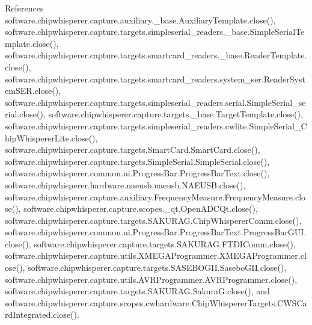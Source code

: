 References software.\+chipwhisperer.\+capture.\+auxiliary.\+\_\+base.\+Auxiliary\+Template.\+close(), software.\+chipwhisperer.\+capture.\+targets.\+simpleserial\+\_\+readers.\+\_\+base.\+Simple\+Serial\+Template.\+close(), software.\+chipwhisperer.\+capture.\+targets.\+smartcard\+\_\+readers.\+\_\+base.\+Reader\+Template.\+close(), software.\+chipwhisperer.\+capture.\+targets.\+smartcard\+\_\+readers.\+system\+\_\+ser.\+Reader\+System\+S\+E\+R.\+close(), software.\+chipwhisperer.\+capture.\+targets.\+simpleserial\+\_\+readers.\+serial.\+Simple\+Serial\+\_\+serial.\+close(), software.\+chipwhisperer.\+capture.\+targets.\+\_\+base.\+Target\+Template.\+close(), software.\+chipwhisperer.\+capture.\+targets.\+simpleserial\+\_\+readers.\+cwlite.\+Simple\+Serial\+\_\+\+Chip\+Whisperer\+Lite.\+close(), software.\+chipwhisperer.\+capture.\+targets.\+Smart\+Card.\+Smart\+Card.\+close(), software.\+chipwhisperer.\+capture.\+targets.\+Simple\+Serial.\+Simple\+Serial.\+close(), software.\+chipwhisperer.\+common.\+ui.\+Progress\+Bar.\+Progress\+Bar\+Text.\+close(), software.\+chipwhisperer.\+hardware.\+naeusb.\+naeusb.\+N\+A\+E\+U\+S\+B.\+close(), software.\+chipwhisperer.\+capture.\+auxiliary.\+Frequency\+Measure.\+Frequency\+Measure.\+close(), software.\+chipwhisperer.\+capture.\+scopes.\+\_\+qt.\+Open\+A\+D\+C\+Qt.\+close(), software.\+chipwhisperer.\+capture.\+targets.\+S\+A\+K\+U\+R\+A\+G.\+Chip\+Whisperer\+Comm.\+close(), software.\+chipwhisperer.\+common.\+ui.\+Progress\+Bar.\+Progress\+Bar\+Text.\+Progress\+Bar\+G\+U\+I.\+close(), software.\+chipwhisperer.\+capture.\+targets.\+S\+A\+K\+U\+R\+A\+G.\+F\+T\+D\+I\+Comm.\+close(), software.\+chipwhisperer.\+capture.\+utils.\+X\+M\+E\+G\+A\+Programmer.\+X\+M\+E\+G\+A\+Programmer.\+close(), software.\+chipwhisperer.\+capture.\+targets.\+S\+A\+S\+E\+B\+O\+G\+I\+I.\+Sasebo\+G\+I\+I.\+close(), software.\+chipwhisperer.\+capture.\+utils.\+A\+V\+R\+Programmer.\+A\+V\+R\+Programmer.\+close(), software.\+chipwhisperer.\+capture.\+targets.\+S\+A\+K\+U\+R\+A\+G.\+Sakura\+G.\+close(), and software.\+chipwhisperer.\+capture.\+scopes.\+cwhardware.\+Chip\+Whisperer\+Targets.\+C\+W\+S\+Card\+Integrated.\+close().


